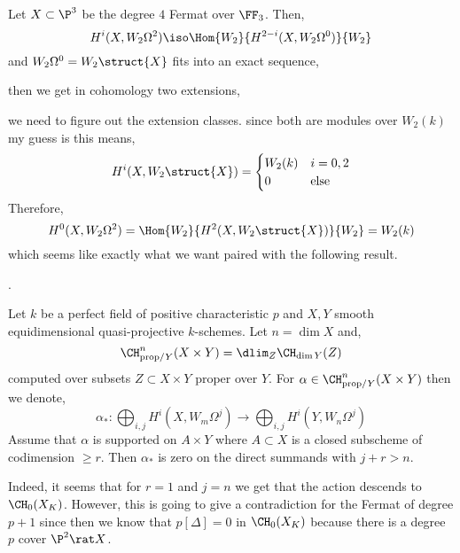 \documentclass[12pt]{article}
\begin{document}
\begin{example}
Let $X \subset \P^3$ be the degree $4$ Fermat over $\FF_3$. Then,
\[ H^i(X, W_2 \Omega^2) \iso \Hom{W_2}{H^{2-i}(X, W_2 \Omega^{0})}{W_2} \]
and $W_2 \Omega^0 = W_2 \struct{X}$ fits into an exact sequence,
\begin{center}
\end{center}
then we get in cohomology two extensions,
\begin{center}
\end{center}
we need to figure out the extension classes.
since both are modules over $W_2(k)$ my guess is this means,
\[ H^i(X, W_2 \struct{X}) = 
\begin{cases}
W_2(k) & i = 0,2
\\
0 & \text{else}
\end{cases} \]
Therefore, 
\[ H^0(X, W_2 \Omega^2) = \Hom{W_2}{H^2(X, W_2 \struct{X})}{W_2} = W_2(k) \]
which seems like exactly what we want paired with the following result.
\end{example}

.


\begin{lemma}[Lemma 7.1]
Let $k$ be a perfect field of positive characteristic $p$ and $X, Y$ smooth equidimensional quasi-projective $k$-schemes. Let $n = \dim{X}$ and,
\[ \CH^n_{\mathrm{prop}/Y}(X \times Y) = \dlim_{Z} \CH_{\dim{Y}}(Z) \]
computed over subsets $Z \subset X \times Y$ proper over $Y$. For $\alpha \in \CH^n_{\mathrm{prop} / Y}(X \times Y)$ then we denote,
\[ \alpha_* : \bigoplus_{i,j} H^i(X, W_m \Omega^j) \to \bigoplus_{i,j} H^i(Y, W_n \Omega^j) \]
Assume that $\alpha$ is supported on $A \times Y$ where $A \subset X$ is a closed subscheme of codimension $\ge r$. Then $\alpha_*$ is zero on the direct summands with $j + r > n$.
\end{lemma}

Indeed, it seems that for $r = 1$ and $j = n$ we get that the action descends to $\CH_0(X_K)$. However, this is going to give a contradiction for the Fermat of degree $p+1$ since then we know that $p [\Delta] = 0$ in $\CH_0(X_K)$ because there is a degree $p$ cover $\P^2 \rat X$.
\end{document}

